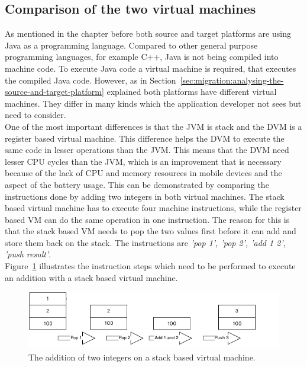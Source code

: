 \subsection{Comparison of the two virtual machines}
\label{sec:migration:comparison-of-the-two-virtual-machines}
As mentioned in the chapter before both source and target platforms are using Java as a programming language.
Compared to other general purpose programming languages, for example C++, Java is not being compiled into machine code.
To execute Java code a virtual machine is required, that executes the compiled Java code.
However, as in Section~\ref{sec:migration:analysing-the-source-and-target-platform} explained both platforms have different virtual machines.
They differ in many kinds which the application developer not sees but need to consider.
\\
One of the most important differences is that the JVM is stack and the DVM is a register based virtual machine.
This difference helps the DVM to execute the same code in lesser operations than the JVM.
This means that the DVM need lesser CPU cycles than the JVM, which is an improvement that is necessary because of the lack of CPU and memory resources in mobile devices and the aspect of the battery usage.
This can be demonstrated by comparing the instructions done by adding two integers in both virtual machines.
The stack based virtual machine has to execute four machine instructions, while the register based VM can do the same operation in one instruction.
The reason for this is that the stack based VM needs to pop the two values first before it can add and store them back on the stack.
The instructions are \textit{'pop 1', 'pop 2', 'add 1 2', 'push result'}.\\
Figure~\ref{fig:stack-based-addition} illustrates the instruction steps which need to be performed to execute an addition with a stack based virtual machine.
\begin{figure}[h]
\begin{center}
\includegraphics[scale=0.65]{images/stack-based-addition.png} 
\caption{The addition of two integers on a stack based virtual machine.}
\label{fig:stack-based-addition}
\end{center}
\end{figure}
